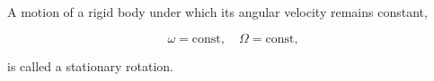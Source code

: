 A motion of a rigid body under which its angular velocity remains constant,

$$\omega = \text{const}, \quad \Omega = \text{const},$$

is called a stationary rotation.
